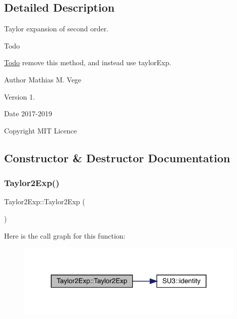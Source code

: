 \subsection{Detailed Description}
Taylor expansion of second order. 

\begin{DoxyRefDesc}{Todo}
\item[\mbox{\hyperlink{todo__todo000002}{Todo}}]remove this method, and instead use taylor\+Exp.\end{DoxyRefDesc}


\begin{DoxyAuthor}{Author}
Mathias M. Vege 
\end{DoxyAuthor}
\begin{DoxyVersion}{Version}
1. 
\end{DoxyVersion}
\begin{DoxyDate}{Date}
2017-\/2019 
\end{DoxyDate}
\begin{DoxyCopyright}{Copyright}
M\+IT Licence 
\end{DoxyCopyright}


\subsection{Constructor \& Destructor Documentation}
\mbox{\label{class_taylor2_exp_ac3b48be4c567e163f7baaa041121a93f}} 
\subsubsection{\texorpdfstring{Taylor2Exp()}{Taylor2Exp()}}
{\footnotesize\ttfamily Taylor2\+Exp\+::\+Taylor2\+Exp (\begin{DoxyParamCaption}{ }\end{DoxyParamCaption})}

Here is the call graph for this function\+:
\nopagebreak
\begin{figure}[H]
\begin{center}
\leavevmode
\includegraphics[width=309pt]{class_taylor2_exp_ac3b48be4c567e163f7baaa041121a93f_cgraph}
\end{center}
\end{figure}


